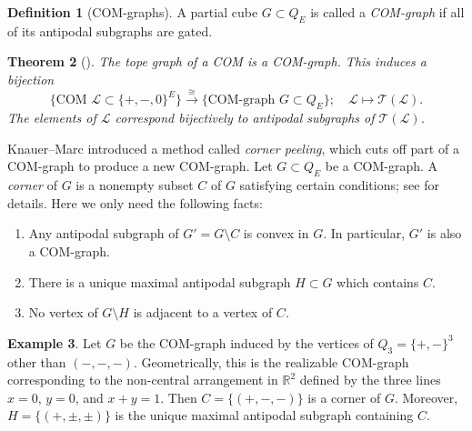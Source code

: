 \documentclass{amsart}
\numberwithin{equation}{section}
\newtheorem{thm}{Theorem}[section]
\theoremstyle{plain}
\theoremstyle{remark}
\theoremstyle{definition}
\newtheorem{defn}[thm]{Definition}
\newtheorem{ex}[thm]{Example}
\numberwithin{equation}{section}
\begin{document}
\begin{defn}[COM-graphs]
    A partial cube $G\subset Q_E$ is called a \emph{COM-graph} if all of its antipodal subgraphs are gated.
\end{defn}

\begin{thm}[{\cite[Theorem 1.1]{KM-COM}}]
    The tope graph of a COM is a COM-graph.
    This induces a bijection
    \[
    \bigl\{\text{COM }\mathcal{L}\subset \{+,-,0\}^E\bigr\}\xrightarrow{\cong}
    \{\text{COM-graph }G\subset Q_E\};\quad \mathcal{L}\mapsto \mathcal{T}(\mathcal{L}).
    \]
    The elements of $\mathcal{L}$ correspond bijectively to antipodal subgraphs of $\mathcal{T}(\mathcal{L})$.
\end{thm}


Knauer--Marc \cite{KM-corners} introduced a method called \emph{corner peeling}, which cuts off part of a COM-graph to produce a new COM-graph.
Let $G\subset Q_E$ be a COM-graph.
A \emph{corner} of $G$ is a nonempty subset $C$ of $G$ satisfying certain conditions; see \cite[Section 5]{KM-corners} for details.
Here we only need the following facts:
\begin{enumerate}
    \item Any antipodal subgraph of $G'=G\setminus C$ is convex in $G$.
    In particular, $G'$ is also a COM-graph.
    \item There is a unique maximal antipodal subgraph $H\subset G$ which contains $C$.
    \item No vertex of $G\setminus H$ is adjacent to a vertex of $C$.
\end{enumerate}

\begin{ex}
Let $G$ be the COM-graph induced by the vertices of $Q_3=\{+,-\}^3$ other than $(-,-,-)$. Geometrically, this is the realizable COM-graph corresponding to the non-central arrangement in $\mathbb{R}^2$ defined by the three lines $x=0$, $y=0$, and $x+y=1$. Then $C=\{(+,-,-)\}$ is a corner of $G$. Moreover, $H=\{(+,\pm,\pm)\}$ is the unique maximal antipodal subgraph containing $C$.
\end{ex}
\end{document}
